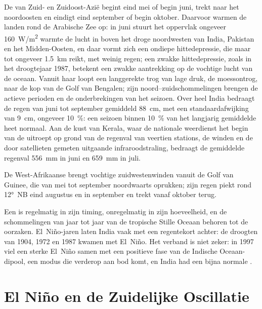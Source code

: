De  van Zuid- en Zuidoost-Azië begint eind mei of begin juni, trekt naar het
noordoosten en eindigt eind september of begin oktober. Daarvoor warmen de landen rond de
Arabische Zee op: in juni stuurt het oppervlak ongeveer \qty{160}{W/m^2} warmte de lucht in boven
het droge noordwesten van India, Pakistan en het Midden-Oosten, en daar vormt zich een ondiepe hittedepressie,
die maar tot ongeveer \qty{1.5}{km} reikt, met weinig regen; een zwakke hittedepressie, zoals in het droogtejaar
1987, betekent een zwakke aantrekking op de vochtige lucht van de oceaan. Vanuit haar loopt een langgerekte trog van lage druk, de
moessontrog, naar de kop van de Golf van Bengalen; zijn noord--zuidschommelingen brengen de actieve
perioden en de onderbrekingen van het seizoen. Over heel India bedraagt de regen van juni tot september gemiddeld
\qty{88}{cm}, met een standaardafwijking van \qty{9}{cm}, ongeveer \qty{10}{\percent}: een seizoen binnen
\qty{10}{\percent} van het langjarig gemiddelde heet normaal. Aan de kust van Kerala, waar de
nationale weerdienst het begin van de  uitroept op grond van de regenval van veertien stations,
de winden en de door satellieten gemeten uitgaande infraroodstraling, bedraagt de gemiddelde regenval
\qty{556}{mm} in juni en \qty{659}{mm} in juli.

De West-Afrikaanse  brengt vochtige zuidwestenwinden vanuit de Golf van Guinee, die van mei tot september
noordwaarts oprukken; zijn regen piekt rond \ang{12}~NB eind augustus en in september en
trekt vanaf oktober terug.

Een  is regelmatig in zijn timing, onregelmatig in zijn hoeveelheid, en de schommelingen van jaar tot jaar van de
tropische Stille Oceaan behoren tot de oorzaken. El~Niño-jaren laten India vaak met een regentekort achter: de
droogten van 1904, 1972 en 1987 kwamen met El~Niño. Het verband is niet zeker: in 1997 viel een sterke
El~Niño samen met een positieve fase van de Indische Oceaan-dipool, een modus die verderop aan bod komt, en India
had een bijna normale .

\section{El Niño en de Zuidelijke Oscillatie}\label{sec:b2:climate-variability:enso}

